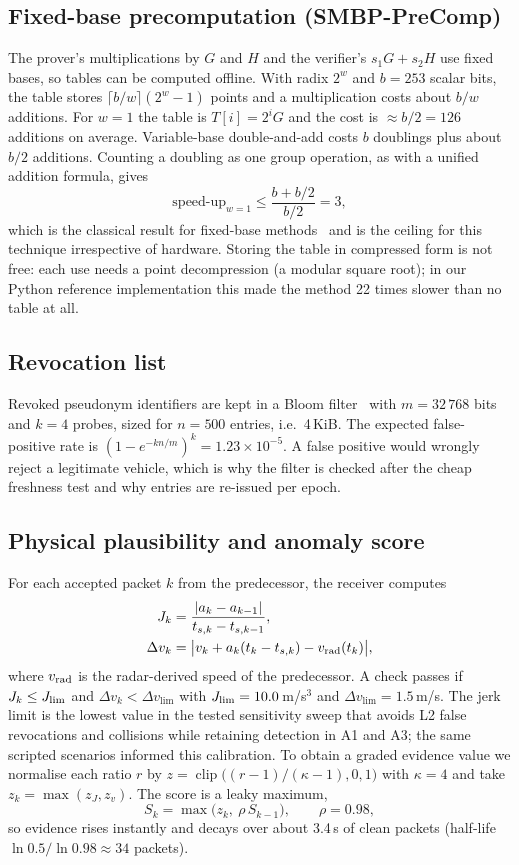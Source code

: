 \documentclass[journal]{IEEEtran}
\newcommand{\clip}{\operatorname{clip}}
\begin{document}
\subsection{Fixed-base precomputation (SMBP-PreComp)}
The prover's multiplications by $G$ and $H$ and the verifier's $s_1G+s_2H$ use fixed bases, so tables can be computed offline. With radix $2^w$ and $b=253$ scalar bits, the table stores $\lceil b/w\rceil(2^w-1)$ points and a multiplication costs about $b/w$ additions. For $w=1$ the table is $T[i]=2^iG$ and the cost is $\approx b/2=126$ additions on average. Variable-base double-and-add costs $b$ doublings plus about $b/2$ additions. Counting a doubling as one group operation, as with a unified addition formula, gives
\begin{equation}
\text{speed-up}_{w=1}\le\frac{b+b/2}{b/2}=3,
\end{equation}
which is the classical result for fixed-base methods~\cite{bgmw1992} and is the ceiling for this technique irrespective of hardware. Storing the table in compressed form is not free: each use needs a point decompression (a modular square root); in our Python reference implementation this made the method 22 times slower than no table at all.

\subsection{Revocation list}
Revoked pseudonym identifiers are kept in a Bloom filter~\cite{bloom1970} with $m=32\,768$ bits and $k=4$ probes, sized for $n=500$ entries, i.e.\ 4\,KiB. The expected false-positive rate is $(1-e^{-kn/m})^k=1.23\times10^{-5}$. A false positive would wrongly reject a legitimate vehicle, which is why the filter is checked after the cheap freshness test and why entries are re-issued per epoch.

\subsection{Physical plausibility and anomaly score}
For each accepted packet $k$ from the predecessor, the receiver computes
\begin{align}
J_k&=\frac{|a_k-a_{k-1}|}{t_{s,k}-t_{s,k-1}},\\
\Delta v_k&=\big|v_k+a_k(t_k-t_{s,k})-v_{\rm rad}(t_k)\big|,
\end{align}
where $v_{\rm rad}$ is the radar-derived speed of the predecessor. A check passes if $J_k\le J_{\rm lim}$ and $\Delta v_k<\Delta v_{\lim}$ with $J_{\rm lim}=10.0$\,m/s$^3$ and $\Delta v_{\lim}=1.5$\,m/s. The jerk limit is the lowest value in the tested sensitivity sweep that avoids L2 false revocations and collisions while retaining detection in A1 and A3; the same scripted scenarios informed this calibration. To obtain a graded evidence value we normalise each ratio $r$ by $z=\clip\big((r-1)/(\kappa-1),0,1\big)$ with $\kappa=4$ and take $z_k=\max(z_J,z_v)$. The score is a leaky maximum,
\begin{equation}
S_k=\max\big(z_k,\ \rho\,S_{k-1}\big),\qquad \rho=0.98,
\end{equation}
so evidence rises instantly and decays over about 3.4\,s of clean packets (half-life $\ln 0.5/\ln 0.98\approx 34$ packets).
\end{document}
